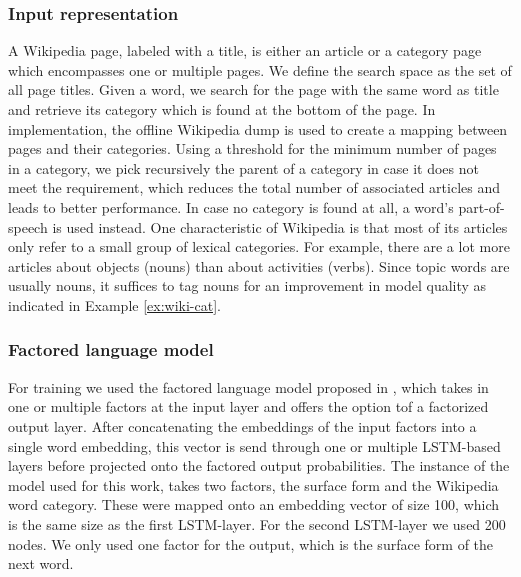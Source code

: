 \documentclass[a4paper]{article}
\begin{document}
\subsubsection{Input representation}
A Wikipedia page, labeled with a title, is either an article or a category page which encompasses one or multiple pages.
We define the search space as the set of all page titles. Given a word, we search for the page with the same word as title and retrieve its category which is found at the bottom of the page.
In implementation, the offline Wikipedia dump is used to create a mapping between pages and their categories. Using a threshold for the minimum number of pages in a category, we pick recursively the parent of a category in case it does not meet the requirement, which reduces the total number of associated articles and leads to better performance. In case no category is found at all, a word's part-of-speech is used instead.
One characteristic of Wikipedia is that most of its articles only refer to a small group of lexical categories. For example, there are a lot more articles about objects (nouns) than about activities (verbs). Since topic words are usually nouns, it suffices to tag nouns for an improvement in model quality as indicated in Example \ref{ex:wiki-cat}.

\subsubsection{Factored language model}
For training we used the factored language model proposed in \cite{niehuesusing}, which takes in one or multiple factors at the input layer and offers the option tof a factorized output layer. After concatenating the embeddings of the input factors into a single word embedding, this vector is send through one or multiple LSTM-based layers before projected onto the factored output probabilities. The instance of the model used for this work, takes two factors, the surface form and the Wikipedia word category. These were mapped onto an embedding vector of size 100, which is the same size as the first LSTM-layer. For the second LSTM-layer we used 200 nodes. We only used one factor for the output, which is the surface form of the next word.
\end{document}
